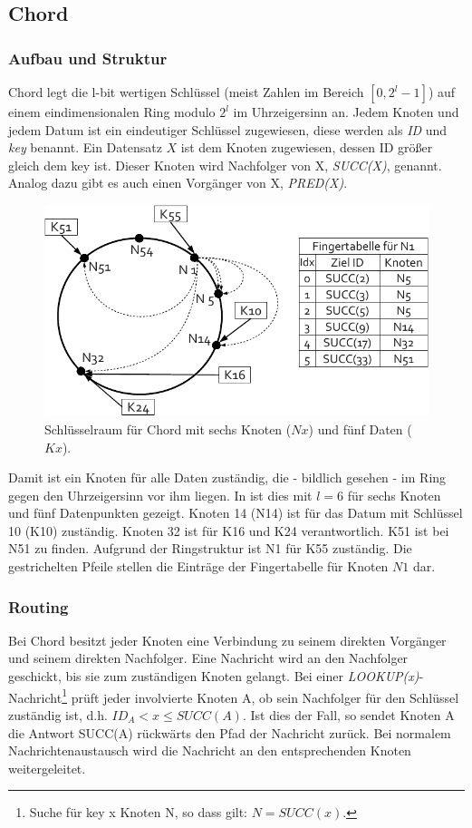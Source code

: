 \subsection{Chord}
\label{chap:evaluation_chord}

\subsubsection*{Aufbau und Struktur}
Chord \cite{Stoica2003} legt die l-bit wertigen Schlüssel (meist Zahlen im Bereich $[0,2^l-1]$) auf einem eindimensionalen Ring modulo $2^l$ im Uhrzeigersinn an. Jedem Knoten und jedem Datum ist ein eindeutiger Schlüssel zugewiesen, diese werden als \emph{ID} und \emph{key} benannt. Ein Datensatz $X$ ist dem Knoten zugewiesen, dessen ID größer gleich dem key ist. Dieser Knoten wird Nachfolger von X, \emph{SUCC(X)}, genannt. Analog dazu gibt es auch einen Vorgänger von X, \emph{PRED(X)}.

\begin{figure}[htbp]
\centering
\includegraphics{grafics/chord_key_space.pdf}
\caption{Schlüsselraum für Chord mit sechs Knoten ($Nx$) und fünf Daten ($Kx$).}
\label{fig:chord_key_space}
\end{figure}

Damit ist ein Knoten für alle Daten zuständig, die - bildlich gesehen - im Ring gegen den Uhrzeigersinn vor ihm liegen. In  ist dies mit $l=6$ für sechs Knoten und fünf Datenpunkten gezeigt. Knoten 14 (N14) ist für das Datum mit Schlüssel 10 (K10) zuständig. Knoten 32 ist für K16 und K24 verantwortlich. K51 ist bei N51 zu finden. Aufgrund der Ringstruktur ist N1 für K55 zuständig. Die gestrichelten Pfeile stellen die Einträge der Fingertabelle für Knoten $N1$ dar. 

\subsubsection*{Routing}
Bei Chord besitzt jeder Knoten eine Verbindung zu seinem direkten Vorgänger und seinem direkten Nachfolger. Eine Nachricht wird an den Nachfolger geschickt, bis sie zum zuständigen Knoten gelangt. Bei einer \emph{LOOKUP(x)}-Nachricht\footnote{Suche für key x Knoten N, so dass gilt: $N = SUCC(x)$.} prüft jeder involvierte Knoten A, ob sein Nachfolger für den Schlüssel zuständig ist, d.h. $ID_A < x \le SUCC(A)$. Ist dies der Fall, so sendet Knoten A die Antwort SUCC(A) rückwärts den Pfad der Nachricht zurück. Bei normalem Nachrichtenaustausch wird die Nachricht an den entsprechenden Knoten weitergeleitet.

